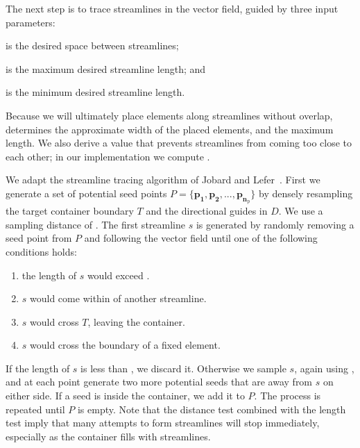 \newtext
{
The next step is to trace streamlines in the vector field, guided by three input parameters:
\begin{packeddescriptions}
\item[\newtext{$s_\mathrm{gap}$}] is the desired space between streamlines;
\item[\newtext{$s_\mathrm{max}$}] is the maximum desired streamline length; and
\item[\newtext{$s_\mathrm{min}$}] is the minimum desired streamline length.   
\end{packeddescriptions}
Because we will ultimately place elements along streamlines without overlap,  determines
the approximate width of the placed elements, and  the maximum length.  We also derive
a value  that prevents streamlines from coming too close to each other; in our implementation we
compute .
}

We adapt the streamline tracing algorithm of Jobard and Lefer~\cite{Jobard1997}.
First we generate a set of potential seed points $P = \{ \bm{p_{1}}, \bm{p_{2}}, ... , \bm{p_{n_\mathrm{p}}}\}$  by
densely resampling the target container boundary $T$ and the directional guides in $D$.
We use a sampling distance of .
The first streamline $s$ is generated by randomly removing a seed point from $P$ and following
the vector field until one of the following conditions holds:

\begin{enumerate}
\item the length of $s$ would exceed .
\item $s$ would come within  of another streamline.
\item $s$ would cross $T$, leaving the container.
\item $s$ would cross the boundary of a fixed element.
\end{enumerate}


If the length of $s$ is less than , we discard it. Otherwise we sample 
$s$, again using , and at each point generate two more
potential seeds that are  away from $s$ on either side. If a seed is
inside the container, we add it to $P$.  The process is repeated until $P$ is empty.
Note that the  distance test combined with the  length
test imply that many attempts to form streamlines will stop immediately,
especially as the container fills with streamlines.

